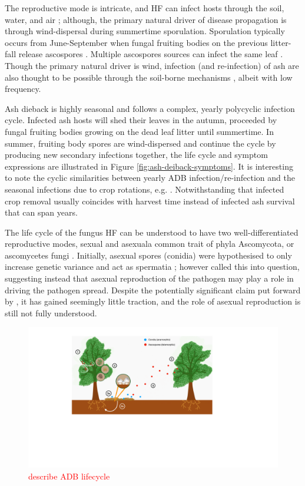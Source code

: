 The reproductive mode is intricate, and HF can infect hosts through the soil,
water, and air \cite{gross2012reproductive}; 
although, the primary natural driver of disease propagation is through wind-dispersal
during summertime sporulation. Sporulation typically occurs from June-September when 
fungal fruiting bodies on the previous litter-fall release ascospores \cite{grosdidier2018tracking, hietala2013invasive}.
Multiple ascospores sources can infect the same leaf \cite{gross2012reproductive}. 
Though the primary natural driver is wind, infection (and re-infection) of ash are also thought to be possible 
through the soil-borne mechanisms \cite{fones2016role}, albeit with low frequency.

Ash dieback is highly seasonal \cite{bengtsson2014seasonal} and follows a complex, yearly polycyclic infection cycle.
Infected ash hosts will shed their leaves in the autumn, proceeded by fungal fruiting bodies growing on the dead leaf litter until summertime.
In summer, fruiting body spores are wind-dispersed and continue the cycle by producing new secondary infections\textemdash 
together, the life cycle and symptom expressions are illustrated in Figure \ref{fig:ash-deiback-symptoms}.
It is interesting to note the cyclic similarities between yearly ADB infection/re-infection and the seasonal
infections due to crop rotations, e.g. \cite{tankam2020modelling}. 
Notwithstanding that infected crop removal usually coincides with harvest time instead of infected ash survival that can span years.

The life cycle of the fungus HF can be understood to have two well-differentiated reproductive modes, 
sexual and asexual\textemdash a common trait of phyla Ascomycota, or ascomycetes fungi \cite{hawker2016physiology}.
Initially, asexual spores (conidia) were hypothesised to only increase genetic variance and act as spermatia \cite{gross2014h};
however \cite{fones2016role} called this into question, suggesting instead that asexual reproduction of the pathogen 
may play a role in driving the pathogen spread. Despite the potentially significant claim put forward by \cite{fones2016role},
it has gained seemingly little traction, and the role of asexual reproduction is still not fully understood.

\begin{figure}
    \centering
    \includegraphics[scale=0.425]{chapter2/figures/ash-dieback-illustration.pdf}
    \caption{\textcolor{red}{describe ADB lifecycle} \blindtext }
    \label{fig:my_label}
\end{figure}

